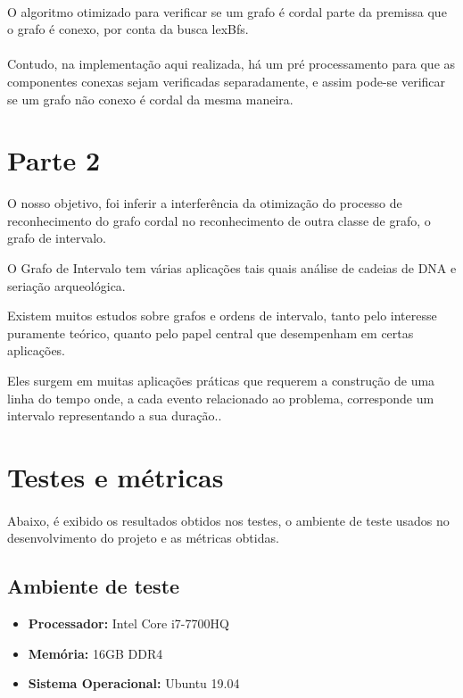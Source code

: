 \documentclass[a4paper, 11pt]{article}
\begin{document}
						\paragraph{}O algoritmo otimizado para verificar se um grafo é cordal parte da premissa que o grafo é conexo, por conta da busca lexBfs.
						
						\paragraph{}Contudo, na implementação aqui realizada, há um pré processamento para que as componentes conexas sejam verificadas separadamente, e assim pode-se verificar se um grafo não conexo é cordal da mesma maneira.
						
						
			
		\section{Parte 2}
			O nosso objetivo, foi inferir a interferência da otimização do processo de reconhecimento do grafo cordal no reconhecimento de outra classe de grafo, o grafo de intervalo.
						
			O Grafo de Intervalo tem várias aplicações tais quais análise de cadeias de DNA e seriação arqueológica.
			
			Existem  muitos  estudos  sobre  grafos  e  ordens  de  intervalo,   tanto  pelo  interesse  puramente  teórico,  quanto  pelo  papel  central  que  desempenham  em  certas aplicações.
			\par Eles surgem em muitas aplicações práticas que requerem a construção de uma linha do tempo onde, a cada evento relacionado ao problema, corresponde um intervalo representando a sua duração..
		\section{Testes e métricas}	
			\paragraph{}Abaixo, é exibido os resultados obtidos nos testes, o ambiente de teste usados no desenvolvimento do projeto e as métricas  obtidas.
			\subsection{Ambiente de teste}
				\begin{itemize}
					\item \textbf{Processador:} Intel Core i7-7700HQ
					\item \textbf{Memória:} 16GB DDR4
					\item \textbf{Sistema Operacional:} Ubuntu 19.04
				\end{itemize}
\end{document}
